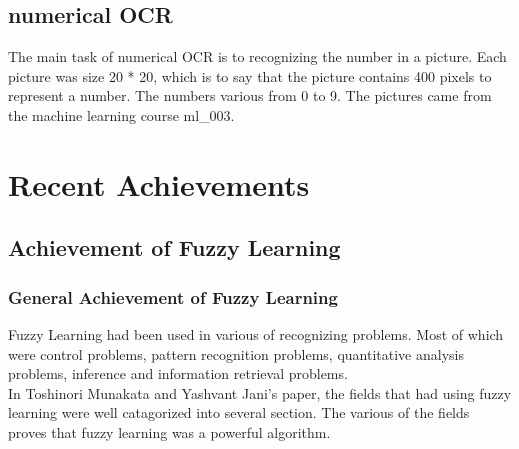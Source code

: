 \documentclass[12pt]{article} %
\begin{document}

\subsection{numerical OCR} 
The main task of numerical OCR is to recognizing the number in a picture. Each picture was size 20 * 20, which is to say that the picture contains 400 pixels to represent a number. The numbers various from 0 to 9. The pictures came from the machine learning course ml\_003.


\section{Recent Achievements} %
\subsection{Achievement of Fuzzy Learning}
\subsubsection{General Achievement of Fuzzy Learning}
Fuzzy Learning had been used in various of recognizing problems. Most of which were control problems, pattern recognition problems, quantitative analysis problems, inference and information retrieval problems. \\
In Toshinori Munakata and Yashvant Jani's paper, the fields that had using fuzzy learning were well catagorized into several section. The various of the fields proves that fuzzy learning was a powerful algorithm.
\end{document}
